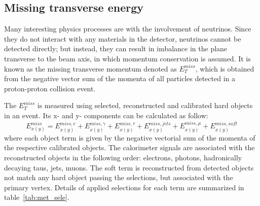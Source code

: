 \subsection{Missing transverse energy}

Many interesting physics processes are with the involvement of neutrinos.
Since they do not interact with any materials in the detector, neutrinos cannot be detected directly;
but instead, they can result in imbalance in the plane transverse to the beam axis, in which momentum conservation is assumed.
It is known as the missing transverse momentum denoted as $E_{T}^{miss}$,
which is obtained from the negative vector sum of the momenta of all particles detected in a proton-proton collision event.

The $E_{T}^{miss}$ is measured using selected, reconstructed and calibrated hard objects in an event.
Its x- and y- components can be calculated as follow\cite{Aaboud2018}:
\begin{equation} \label{eq:met_xy}
	E_{x(y)}^{miss} = E_{x(y)}^{miss, e} + E_{x(y)}^{miss, \gamma} + E_{x(y)}^{miss, \tau} + E_{x(y)}^{miss, jets} + E_{x(y)}^{miss, \mu} + E_{x(y)}^{miss, soft}
\end{equation}
where each object term is given by the negative vectorial sum of the momenta of the respective calibrated objects.
The calorimeter signals are associated with the reconstructed objects in the following order: electrons, photons, hadronically decaying taus, jets, muons.
The soft term is reconstructed from detected objects not match any hard object passing the selections, but associated with the primary vertex.
Details of applied selections for each term are summarized in table~\ref{tab:met_sele}.
